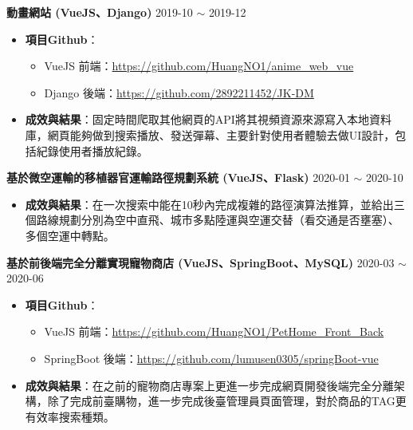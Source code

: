 \documentclass[classical]{einfart}
\begin{document}
\textbf{動畫網站 (VueJS、Django)} \hfill 2019-10 $\sim$ 2019-12

\begin{itemize}[parsep=0.5ex]

  \item \textbf{項目Github}：
  
  \begin{itemize}[parsep=0.5ex]
    \item VueJS 前端：\href{https://github.com/HuangNO1/anime_web_vue}{https://github.com/HuangNO1/anime\_web\_vue}
    \item Django 後端：\href{https://github.com/2892211452/JK-DM}{https://github.com/2892211452/JK-DM}
  \end{itemize}

  \item \textbf{成效與結果}：固定時間爬取其他網頁的API將其視頻資源來源寫入本地資料庫，網頁能夠做到搜索播放、發送彈幕、主要針對使用者體驗去做UI設計，包括紀錄使用者播放紀錄。

\end{itemize}

\newline

\textbf{基於微空運輸的移植器官運輸路徑規劃系統 (VueJS、Flask)} \hfill 2020-01 $\sim$ 2020-10

\begin{itemize}[parsep=0.5ex]

  \item \textbf{成效與結果}：在一次搜索中能在10秒內完成複雜的路徑演算法推算，並給出三個路線規劃分別為空中直飛、城市多點陸運與空運交替（看交通是否壅塞）、多個空運中轉點。

\end{itemize}

\newline

\textbf{基於前後端完全分離實現寵物商店 (VueJS、SpringBoot、MySQL)} \hfill 2020-03 $\sim$ 2020-06

\begin{itemize}[parsep=0.5ex]

  \item \textbf{項目Github}：
  
  \begin{itemize}[parsep=0.5ex]
    \item VueJS 前端：\href{https://github.com/HuangNO1/PetHome_Front_Back}{https://github.com/HuangNO1/PetHome\_Front\_Back}
    \item SpringBoot 後端：\href{https://github.com/lumusen0305/springBoot-vue}{https://github.com/lumusen0305/springBoot-vue}
  \end{itemize}

  \item \textbf{成效與結果}：在之前的寵物商店專案上更進一步完成網頁開發後端完全分離架構，除了完成前臺購物，進一步完成後臺管理員頁面管理，對於商品的TAG更有效率搜索種類。

\end{itemize}
\end{document}
